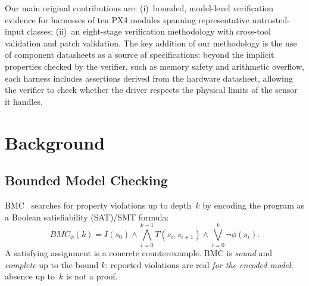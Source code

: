 \documentclass[conference]{IEEEtran}
\newcommand{\entra}[1]{#1}
\newcommand{\corr}[1]{#1}
\begin{document}


Our main original contributions are:
(i)~bounded, model-level verification evidence for harnesses of ten PX4 modules spanning representative untrusted-input classes;
(ii)~an eight-stage verification methodology with cross-tool validation and patch validation.
The key addition of our methodology is the use of component datasheets
as a source of specifications: beyond the implicit properties checked by
the verifier, such as memory safety and arithmetic overflow, each harness
includes assertions derived from the hardware datasheet, allowing the
verifier to check whether the driver respects the physical limits of the
sensor it handles.

\section{Background}
\label{sec:background}

\subsection{Bounded Model Checking}
\label{subsec:bmc}
BMC~\cite{Biere1999} searches for property violations up to depth~$k$
by encoding the program as a \entra{Boolean satisfiability (SAT)}/SMT formula:
\begin{equation}
\mathit{BMC}_\phi(k) =
I(s_0) \wedge
\bigwedge_{i=0}^{k-1} T(s_i, s_{i+1}) \wedge
\bigvee_{i=0}^{k} \neg\phi(s_i).
\label{eq:bmc}
\end{equation}
A satisfying assignment is a concrete counterexample. BMC is \emph{sound} and \emph{complete} up to the bound $k$:
reported violations are real \emph{for the encoded model}; absence up to~$k$ is not a proof.
\end{document}
